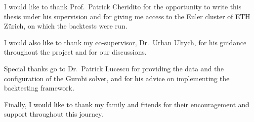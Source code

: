 
I would like to thank Prof.\ Patrick Cheridito for the opportunity to write this thesis under his supervision and
for giving me access to the Euler cluster of ETH Zürich, on which the backtests were run.

I would also like to thank my co-supervisor, Dr.\ Urban Ulrych, for his guidance throughout the project and for our
discussions.

Special thanks go to Dr.\ Patrick Lucescu for providing the data and the configuration of the Gurobi solver, and
for his advice on implementing the backtesting framework.

Finally, I would like to thank my family and friends for their encouragement and support throughout this journey.
